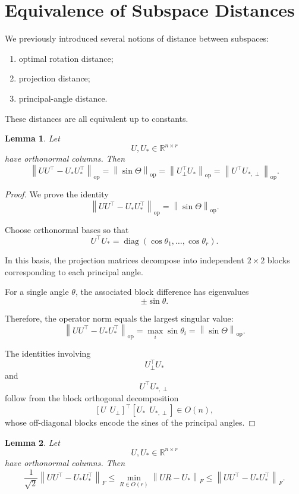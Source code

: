 \documentclass[12pt,oneside]{book}
\numberwithin{equation}{section}
\theoremstyle{definition}
\theoremstyle{plain}
\newtheorem{lemma}{Lemma}[section]
\theoremstyle{remark}
\newcommand{\R}{\mathbb{R}}
\newcommand{\norm}[1]{\left\lVert #1 \right\rVert}
\newcommand{\diag}{\operatorname{diag}}
\begin{document}
\section{Equivalence of Subspace Distances}

We previously introduced several notions of distance between subspaces:
\begin{enumerate}
\item optimal rotation distance;
\item projection distance;
\item principal-angle distance.
\end{enumerate}

These distances are all equivalent up to constants.

\begin{lemma}
Let
\[
U,U_*\in\R^{n\times r}
\]
have orthonormal columns. Then
\[
\norm{UU^\top-U_*U_*^\top}_{\mathrm{op}}
=
\norm{\sin\Theta}_{\mathrm{op}}
=
\norm{U_\perp^\top U_*}_{\mathrm{op}}
=
\norm{U^\top U_{*,\perp}}_{\mathrm{op}}.
\]
\end{lemma}

\begin{proof}
We prove the identity
\[
\norm{UU^\top-U_*U_*^\top}_{\mathrm{op}}
=
\norm{\sin\Theta}_{\mathrm{op}}.
\]

Choose orthonormal bases so that
\[
U^\top U_*
=
\diag(\cos\theta_1,\dots,\cos\theta_r).
\]

In this basis, the projection matrices decompose into independent $2\times2$ blocks corresponding to each principal angle.

For a single angle $\theta$, the associated block difference has eigenvalues
\[
\pm \sin\theta.
\]

Therefore, the operator norm equals the largest singular value:
\[
\norm{UU^\top-U_*U_*^\top}_{\mathrm{op}}
=
\max_i \sin\theta_i
=
\norm{\sin\Theta}_{\mathrm{op}}.
\]

The identities involving
\[
U_\perp^\top U_*
\]
and
\[
U^\top U_{*,\perp}
\]
follow from the block orthogonal decomposition
\[
[U\ \ U_\perp]^\top
[U_*\ \ U_{*,\perp}]
\in O(n),
\]
whose off-diagonal blocks encode the sines of the principal angles.
\end{proof}

\begin{lemma}
Let
\[
U,U_*\in\R^{n\times r}
\]
have orthonormal columns. Then
\[
\frac{1}{\sqrt{2}}
\norm{UU^\top-U_*U_*^\top}_F
\leq
\min_{R\in O(r)}
\norm{UR-U_*}_F
\leq
\norm{UU^\top-U_*U_*^\top}_F.
\]
\end{lemma}
\end{document}
